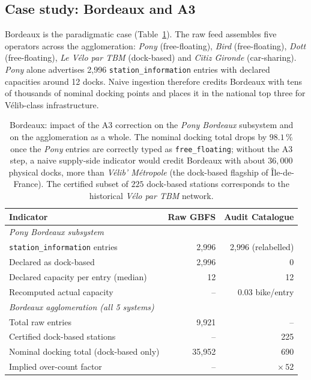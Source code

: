 \documentclass[11pt,a4paper]{article}
\begin{document}
\subsection{Case study: Bordeaux and A3}
Bordeaux is the paradigmatic case (Table~\ref{tab:bordeaux}). The raw
feed assembles five operators across the agglomeration: \emph{Pony}
(free-floating), \emph{Bird} (free-floating), \emph{Dott}
(free-floating), \emph{Le V\'elo par TBM} (dock-based) and \emph{Citiz
Gironde} (car-sharing). \emph{Pony} alone advertises 2{,}996
\texttt{station\_information} entries with declared capacities around
12 docks. Naive ingestion therefore credits Bordeaux with tens of
thousands of nominal docking points and places it in the national top
three for V\'elib-class infrastructure.

\begin{table}[ht]
\centering
\caption{Bordeaux: impact of the A3 correction on the
\emph{Pony Bordeaux} subsystem and on the agglomeration as a whole.
The nominal docking total drops by $98.1\,\%$ once the
\emph{Pony} entries are correctly typed as
\texttt{free\_floating}; without the A3 step, a naive supply-side
indicator would credit Bordeaux with about $36{,}000$ physical
docks, more than \emph{V\'elib' M\'etropole} (the dock-based
flagship of \^Ile-de-France). The certified subset of $225$
dock-based stations corresponds to the historical
\emph{V\'elo par TBM} network.}
\label{tab:bordeaux}
\small
\begin{tabular}{@{}lrr@{}}
\toprule
\textbf{Indicator} & \textbf{Raw GBFS} & \textbf{Audit Catalogue}\\
\midrule
\textit{Pony Bordeaux subsystem} & & \\
\quad \texttt{station\_information} entries & 2{,}996 & 2{,}996 (relabelled) \\
\quad Declared as dock-based                 & 2{,}996 & 0 \\
\quad Declared capacity per entry (median)   & 12      & 12 \\
\quad Recomputed actual capacity             & --      & 0.03 bike/entry \\
\midrule
\textit{Bordeaux agglomeration (all 5 systems)} & & \\
\quad Total raw entries                      & 9{,}921 & -- \\
\quad Certified dock-based stations           & --      & 225 \\
\quad Nominal docking total (dock-based only) & 35{,}952 & 690 \\
\quad Implied over-count factor               & --       & $\times\,52$ \\
\bottomrule
\end{tabular}
\end{table}
\end{document}

